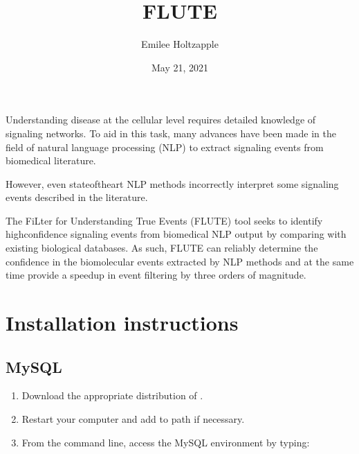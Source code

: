 \documentclass[a4paper,10pt,english]{sphinxmanual}
\title{FLUTE}
\date{May 21, 2021}
\author{Emilee Holtzapple}
\let\sphinxpxdimen\pdfpxdimen\else\newdimen\sphinxpxdimen
\begin{document}
\pagestyle{empty}
\sphinxmaketitle
\pagestyle{plain}
\sphinxtableofcontents
\pagestyle{normal}
\label{\detokenize{index::doc}}


\sphinxAtStartPar
Understanding disease at the cellular level requires detailed knowledge of signaling networks. To aid in this task, many advances have been made in the field of natural language processing (NLP) to extract signaling events from biomedical literature.

\sphinxAtStartPar
However, even state\sphinxhyphen{}of\sphinxhyphen{}the\sphinxhyphen{}art NLP methods incorrectly interpret some signaling events described in the literature.

\noindent\sphinxincludegraphics[width=400\sphinxpxdimen]{{figure_1}.png}

\sphinxAtStartPar
The FiLter for Understanding True Events (FLUTE) tool seeks to identify high\sphinxhyphen{}confidence signaling events from biomedical NLP output by comparing with existing biological databases. As such, FLUTE can reliably determine the confidence in the biomolecular events extracted by NLP methods and at the same time provide a speedup in event filtering by three orders of magnitude.


\chapter{Installation instructions}
\label{\detokenize{Installation:installation-instructions}}\label{\detokenize{Installation::doc}}

\section{MySQL}
\label{\detokenize{Installation:mysql}}\begin{enumerate}
%
\item {} 
\sphinxAtStartPar
Download the appropriate distribution of .

\item {} 
\sphinxAtStartPar
Restart your computer and add to path if necessary.

\item {} 
\sphinxAtStartPar
From the command line, access the MySQL environment by typing:

\begin{sphinxVerbatim}[commandchars=\\\{\}]
  
\end{sphinxVerbatim}

\end{enumerate}
\end{document}
